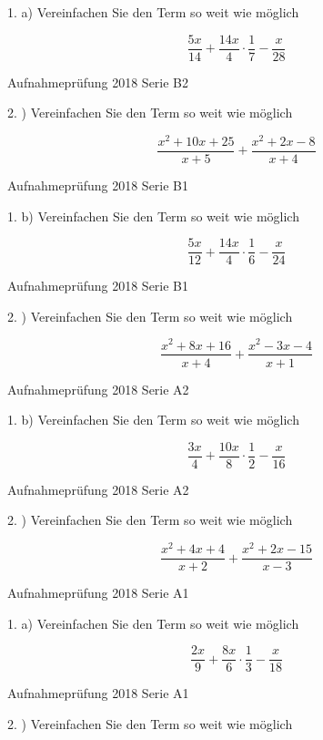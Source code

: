 {1. a) Vereinfachen Sie den Term so weit wie möglich

$$\frac{5x}{14} + \frac{14x}4 \cdot{} \frac17 - \frac{x}{28}$$

Aufnahmeprüfung 2018 Serie B2

2. ) Vereinfachen Sie den Term so weit wie möglich

$$\frac{x^2+10x+25}{x+5} + \frac{x^2+2x-8}{x+4}$$

Aufnahmeprüfung 2018 Serie B1

1. b) Vereinfachen Sie den Term so weit wie möglich

$$\frac{5x}{12} + \frac{14x}{4} \cdot{} \frac16 - \frac{x}{24}$$

Aufnahmeprüfung 2018 Serie B1

2. ) Vereinfachen Sie den Term so weit wie möglich

$$\frac{x^2+8x+16}{x+4} + \frac{x^2-3x-4}{x+1}$$

Aufnahmeprüfung 2018 Serie A2

1. b) Vereinfachen Sie den Term so weit wie möglich

$$\frac{3x}4 + \frac{10x}8 \cdot{} \frac12 - \frac{x}{16}$$

Aufnahmeprüfung 2018 Serie A2

2. ) Vereinfachen Sie den Term so weit wie möglich

$$\frac{x^2+4x+4}{x+2} + \frac{x^2+2x-15}{x-3}$$

Aufnahmeprüfung 2018 Serie A1

1. a) Vereinfachen Sie den Term so weit wie möglich

$$\frac{2x}9 + \frac{8x}6 \cdot{} \frac13 - \frac{x}{18}$$

Aufnahmeprüfung 2018 Serie A1

2. ) Vereinfachen Sie den Term so weit wie möglich

}
